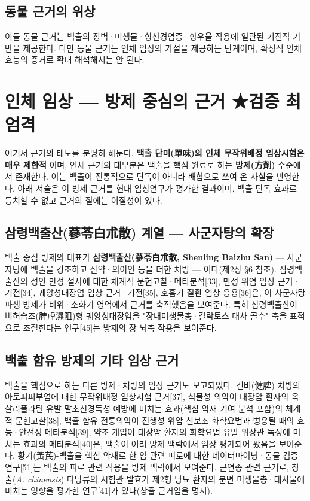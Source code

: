 \documentclass[11pt,oneside]{book}
\begin{document}
\subsection{동물 근거의 위상}
이들 동물 근거는 백출의 장벽·미생물·항신경염증·항우울 작용에 일관된 기전적 기반을 제공한다. 다만 동물 근거는 인체 임상의 가설을 제공하는 단계이며, 확정적 인체 효능의 증거로 확대 해석해서는 안 된다.

\section{인체 임상 — 방제 중심의 근거 ★검증 최엄격}
여기서 근거의 태도를 분명히 해둔다. \textbf{백출 단미(單味)의 인체 무작위배정 임상시험은 매우 제한적} 이며, 인체 근거의 대부분은 백출을 핵심 원료로 하는 \textbf{방제(方劑)} 수준에서 존재한다. 이는 백출이 전통적으로 단독이 아니라 배합으로 쓰여 온 사실을 반영한다. 아래 서술은 이 방제 근거를 현대 임상연구가 평가한 결과이며, 백출 단독 효과로 등치할 수 없고 근거의 질에는 이질성이 있다.

\subsection{삼령백출산(蔘苓白朮散) 계열 — 사군자탕의 확장}
백출 중심 방제의 대표가 \textbf{삼령백출산(蔘苓白朮散, Shenling Baizhu San)} — 사군자탕에 백출을 강조하고 산약·의이인 등을 더한 처방 — 이다(제2장 §6 참조). 삼령백출산의 성인 만성 설사에 대한 체계적 문헌고찰·메타분석[33], 만성 위염 임상 근거·기전[34], 궤양성대장염 임상 근거·기전[35], 호흡기 질환 임상 응용[36]은, 이 사군자탕 파생 방제가 비위·소화기 영역에서 근거를 축적했음을 보여준다. 특히 삼령백출산이 비허습조(脾虛濕阻)형 궤양성대장염을 "장내미생물총·갈락토스 대사-골수" 축을 표적으로 조절한다는 연구[45]는 방제의 장-뇌축 작용을 보여준다.

\subsection{백출 함유 방제의 기타 임상 근거}
백출을 핵심으로 하는 다른 방제·처방의 임상 근거도 보고되었다. 건비(健脾) 처방의 아토피피부염에 대한 무작위배정 임상시험 근거[37], 식물성 의약이 대장암 환자의 옥살리플라틴 유발 말초신경독성 예방에 미치는 효과(핵심 약재 기여 분석 포함)의 체계적 문헌고찰[38], 백출 함유 전통의약이 진행성 위암 신보조 화학요법과 병용될 때의 효능·안전성 메타분석[39], 약초 개입이 대장암 환자의 화학요법 유발 위장관 독성에 미치는 효과의 메타분석[40]은, 백출이 여러 방제 맥락에서 임상 평가되어 왔음을 보여준다. 황기(黃芪)-백출을 핵심 약재로 한 암 관련 피로에 대한 데이터마이닝·동물 검증 연구[51]는 백출의 피로 관련 작용을 방제 맥락에서 보여준다. 근연종 관련 근거로, 창출(\textit{A. chinensis}) 다당류의 시험관 발효가 제2형 당뇨 환자의 분변 미생물총·대사물에 미치는 영향을 평가한 연구[41]가 있다(창출 근거임을 명시).
\end{document}
